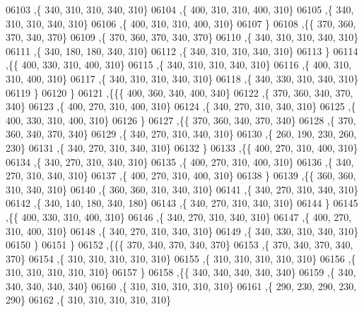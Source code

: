 \begin{DoxyCode}
06103     ,\{   340,   310,   310,   340,   310\}
06104     ,\{   400,   310,   310,   400,   310\}
06105     ,\{   340,   310,   310,   340,   310\}
06106     ,\{   400,   310,   310,   400,   310\}
06107     \}
06108    ,\{\{   370,   360,   370,   340,   370\}
06109     ,\{   370,   360,   370,   340,   370\}
06110     ,\{   340,   310,   310,   340,   310\}
06111     ,\{   340,   180,   180,   340,   310\}
06112     ,\{   340,   310,   310,   340,   310\}
06113     \}
06114    ,\{\{   400,   330,   310,   400,   310\}
06115     ,\{   340,   310,   310,   340,   310\}
06116     ,\{   400,   310,   310,   400,   310\}
06117     ,\{   340,   310,   310,   340,   310\}
06118     ,\{   340,   330,   310,   340,   310\}
06119     \}
06120    \}
06121   ,\{\{\{   400,   360,   340,   400,   340\}
06122     ,\{   370,   360,   340,   370,   340\}
06123     ,\{   400,   270,   310,   400,   310\}
06124     ,\{   340,   270,   310,   340,   310\}
06125     ,\{   400,   330,   310,   400,   310\}
06126     \}
06127    ,\{\{   370,   360,   340,   370,   340\}
06128     ,\{   370,   360,   340,   370,   340\}
06129     ,\{   340,   270,   310,   340,   310\}
06130     ,\{   260,   190,   230,   260,   230\}
06131     ,\{   340,   270,   310,   340,   310\}
06132     \}
06133    ,\{\{   400,   270,   310,   400,   310\}
06134     ,\{   340,   270,   310,   340,   310\}
06135     ,\{   400,   270,   310,   400,   310\}
06136     ,\{   340,   270,   310,   340,   310\}
06137     ,\{   400,   270,   310,   400,   310\}
06138     \}
06139    ,\{\{   360,   360,   310,   340,   310\}
06140     ,\{   360,   360,   310,   340,   310\}
06141     ,\{   340,   270,   310,   340,   310\}
06142     ,\{   340,   140,   180,   340,   180\}
06143     ,\{   340,   270,   310,   340,   310\}
06144     \}
06145    ,\{\{   400,   330,   310,   400,   310\}
06146     ,\{   340,   270,   310,   340,   310\}
06147     ,\{   400,   270,   310,   400,   310\}
06148     ,\{   340,   270,   310,   340,   310\}
06149     ,\{   340,   330,   310,   340,   310\}
06150     \}
06151    \}
06152   ,\{\{\{   370,   340,   370,   340,   370\}
06153     ,\{   370,   340,   370,   340,   370\}
06154     ,\{   310,   310,   310,   310,   310\}
06155     ,\{   310,   310,   310,   310,   310\}
06156     ,\{   310,   310,   310,   310,   310\}
06157     \}
06158    ,\{\{   340,   340,   340,   340,   340\}
06159     ,\{   340,   340,   340,   340,   340\}
06160     ,\{   310,   310,   310,   310,   310\}
06161     ,\{   290,   230,   290,   230,   290\}
06162     ,\{   310,   310,   310,   310,   310\}

\end{DoxyCode}
